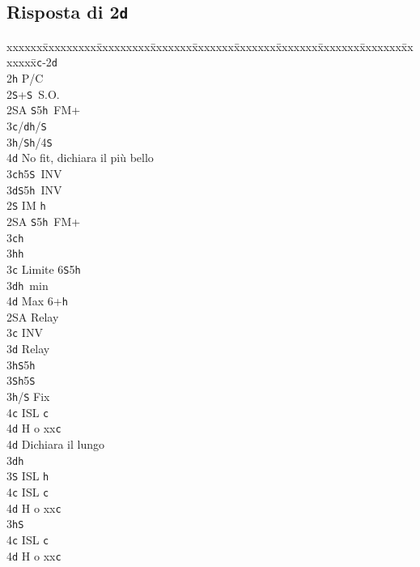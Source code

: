 \documentclass[a4paper,italian]{article}
\newcommand{\BS}{\small{\texttt{S}}}
\newcommand{\BC}{\small{\texttt{c}}}
\newcommand{\BD}{\small{\texttt{d}}}
\newcommand{\BH}{\small{\texttt{h}}}
\newcommand{\pdfd}{\texorpdfstring{\texttt{d}}{D}}
\newenvironment{bidtable}
{\begin{tabbing}

    xxxxxx\=xxxxxxxxx\=xxxxxxxxx\=xxxxxxx\=xxxxxxx\=xxxxxxx\=xxxxxxx\=xxxxxxx\=xxxxxxx\=xxxxxxx\=\kill}
{\end{tabbing} }%
\begin{document}
\begin{multicols}{2}

    \subsection{Risposta di 2\pdfd}

    \begin{bidtable}
        1\BC-2\BD\+\\
        2\BH \> P/C\+\\
        2\BS {}+\BS\ S.O.\\
        2\small{SA} \BS 5\BH\ FM+\+\\
        3\BC/\BD {}\BH /\BS \\
        3\BH/\BS {}\BH /4\BS \\
        4\BD \> No fit, dichiara il più bello\-\\
        3\BC {}\BH 5\BS\ INV\\
        3\BD {}\BS 5\BH\ INV\-\\
        2\BS \> IM \BH \+\\
        2\small{SA} \BS 5\BH\ FM+\+\\
        3\BC {}\BH \\
        3\BH {}\BH \-\\
        3\BC \> Limite 6\BS 5\BH \\
        3\BD {}\BH\ min\\
        4\BD \> Max 6+\BH \-\\
        2\small{SA} \> Relay\+\\
        3\BC {} INV\+\\
        3\BD \> Relay\+\\
        3\BH {}\BS 5\BH \\
        3\BS {}\BH 5\BS \-\\
        3\BH/\BS \> Fix\\
        4\BC \> ISL \BC \+\\
        4\BD \> H o xx\BC \-\\
        4\BD \> Dichiara il lungo\-\\
        3\BD {}\BH \+\\
        3\BS \> ISL \BH \\
        4\BC \> ISL \BC \+\\
        4\BD \> H o xx\BC \-\-\\
        3\BH {}\BS \+\\
        4\BC \> ISL \BC \+\\
        4\BD \> H o xx\BC \-\\

\end{bidtable}
\end{multicols}
\end{document}
